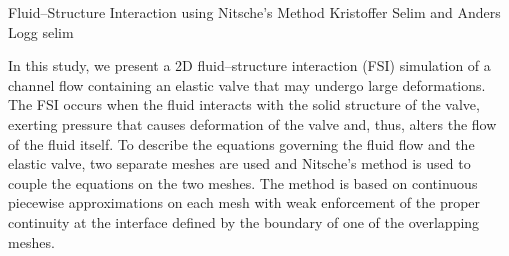               {Fluid--Structure Interaction using Nitsche's Method}
              {Kristoffer Selim and Anders Logg}
              {selim}

In this study, we present a 2D fluid--structure interaction (FSI)
simulation of a channel flow containing an elastic valve that may
undergo large deformations. The FSI occurs when the fluid interacts
with the solid structure of the valve, exerting pressure that causes
deformation of the valve and, thus, alters the flow of the fluid
itself. To describe the equations governing the fluid flow and the
elastic valve, two separate meshes are used and Nitsche's method is
used to couple the equations on the two meshes. The method is based on
continuous piecewise approximations on each mesh with weak enforcement
of the proper continuity at the interface defined by the boundary of
one of the overlapping meshes.
